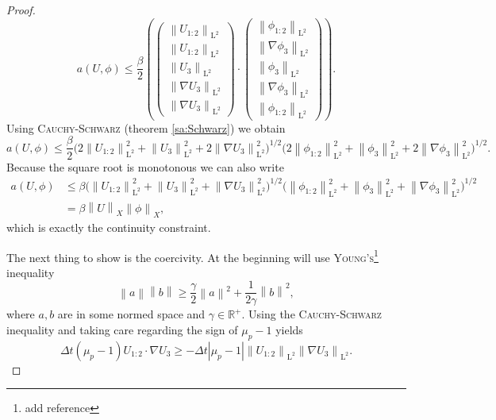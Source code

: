 \documentclass[12pt,a4paper,twoside, open=right]{scrreprt}
\theoremstyle{definition}
\theoremstyle{plain}
\newcommand{\abs}[1]{\left\vert #1\right\vert}
\newcommand{\rr}{\mathbb{R}}
\newcommand{\norm}[1]{\left\lVert#1\right\rVert}
\newcommand{\ltnorm}[1]{\norm{#1}_{\mathrm{L}^2}}
\begin{document}
\begin{proof}
    \begin{equation}
        a(U,\phi)\le \frac{\beta}{2}\left(\begin{pmatrix}
        \ltnorm{U_{1:2}}\\\ltnorm{U_{1:2}}\\\ltnorm{U_{3}}\\\ltnorm{\nabla U_{3}}\\\ltnorm{\nabla U_{3}}
        \end{pmatrix}\cdot \begin{pmatrix}
        \ltnorm{\phi_{1:2}}\\\ltnorm{\nabla\phi_{3}}\\\ltnorm{\phi_{3}}\\\ltnorm{\nabla \phi_{3}}\\\ltnorm{\phi_{1:2}}
        \end{pmatrix}\right).
    \end{equation}
    Using \textsc{Cauchy-Schwarz} (theorem \ref{sa:Schwarz}) we obtain
    \begin{equation}
        a(U,\phi)\le\frac{\beta}{2}\bigg(2\ltnorm{U_{1:2}}^2+\ltnorm{U_3}^2+2\ltnorm{\nabla U_3}^2
        \bigg)^{1/2}\bigg(2\ltnorm{\phi_{1:2}}^2+\ltnorm{\phi_3}^2+2\ltnorm{\nabla \phi_3}^2\bigg)^{1/2}.
    \end{equation}
    Because the square root is monotonous we can also write
    \begin{align}
        a(U,\phi)&\le\beta\bigg(\ltnorm{U_{1:2}}^2+\ltnorm{U_3}^2+\ltnorm{\nabla U_3}^2
        \bigg)^{1/2}\bigg(\ltnorm{\phi_{1:2}}^2+\ltnorm{\phi_3}^2+\ltnorm{\nabla \phi_3}^2\bigg)^{1/2}\\&=\beta\norm{U}_X\norm{\phi}_X,
    \end{align}
    which is exactly the continuity constraint. 
    \par The next thing to show is the coercivity. At the beginning will use \textsc{Young's}\footnote{add reference} inequality 
    \begin{equation}
        \norm{a}\norm{b}\ge\frac{\gamma}{2}\norm{a}^2+\frac{1}{2\gamma}\norm{b}^2,
    \end{equation} where $a,b$ are in some normed space and $\gamma\in\rr^+$.
    Using the \textsc{Cauchy-Schwarz} inequality and taking care regarding the sign of $\mu_p-1$ yields
    \begin{equation}
        \Delta t(\mu_p-1)U_{1:2}\cdot \nabla U_3\ge -\Delta t\abs{\mu_p -1}\ltnorm{U_{1:2}}\ltnorm{\nabla U_3}.
    \end{equation}

\end{proof}
\end{document}
